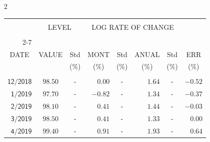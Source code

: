 \begin{multicols}{2}{ 
\begin{tabular}{rccrcrcr} 
\hline 
 \multicolumn{1}{|c|}{}  &  \multicolumn{2}{c|}{} & 
\multicolumn{4}{c}{} & \multicolumn{1}{|c|}{}\vspace{-.10in}\\ 
\multicolumn{1}{|c|}{}  &  \multicolumn{2}{c|}{LEVEL} & 
\multicolumn{4}{c}{LOG RATE OF CHANGE} & \multicolumn{1}{|c|}{}    \\  
\multicolumn{1}{|c|}{}  &  \multicolumn{2}{c|}{} & 
\multicolumn{4}{c}{} & \multicolumn{1}{|c|}{}\vspace{-.10in}\\ \cline{2-7} 
\multicolumn{1}{|c|}{ } &\multicolumn{1}{c|}{ } & \multicolumn{1}{c|}{} & \multicolumn{1}{c|}{} & \multicolumn{1}{c|}{}     & \multicolumn{1}{c|}{} & \multicolumn{1}{c|}{}  & \multicolumn{1}{c|}{}  \vspace{-.05in}\\  
\multicolumn{1}{|c|}{DATE } &\multicolumn{1}{c|}{ VALUE} & \multicolumn{1}{c|}{Std} & \multicolumn{1}{c|}{MONT} & \multicolumn{1}{c|}{Std}     & \multicolumn{1}{c|}{ANUAL} & \multicolumn{1}{c|}{Std}  & \multicolumn{1}{c|}{ERR}\\  
\multicolumn{1}{|c|}{ }      & \multicolumn{1}{c|}{  }    & \multicolumn{1}{c|}{($\%$)}&  \multicolumn{1}{c|}{($\%$)  }  & \multicolumn{1}{c|}{($\%$)} & \multicolumn{1}{c|}{($\%$) }     & \multicolumn{1}{c|}{ ($\%$) }  &  \multicolumn{1}{c|}{ ($\%$) } \\  
 \hline 
 \\$\mathsf{      12/2018}$ &$\mathsf{    98.50}$ &     - &$\mathsf{    0.00}$ &     - &$\mathsf{     1.64 }$ &     - &$\mathsf{  -0.52} $ \vspace{-.005in}\\ 
$\mathsf{       1/2019}$ &$\mathsf{    97.70}$ &     - &$\mathsf{   -0.82}$ &     - &$\mathsf{     1.34 }$ &     - &$\mathsf{  -0.37} $ \vspace{-.005in}\\ 
$\mathsf{       2/2019}$ &$\mathsf{    98.10}$ &     - &$\mathsf{    0.41}$ &     - &$\mathsf{     1.44 }$ &     - &$\mathsf{  -0.03} $ \vspace{-.005in}\\ 
$\mathsf{       3/2019}$ &$\mathsf{    98.50}$ &     - &$\mathsf{    0.41}$ &     - &$\mathsf{     1.33 }$ &     - &$\mathsf{   0.00} $ \vspace{-.005in}\\ 
$\mathsf{       4/2019}$ &$\mathsf{    99.40}$ &     - &$\mathsf{    0.91}$ &     - &$\mathsf{     1.93 }$ &     - &$\mathsf{   0.64} $ \vspace{-.005in}\\ 

\end{tabular}}
\end{multicols}
